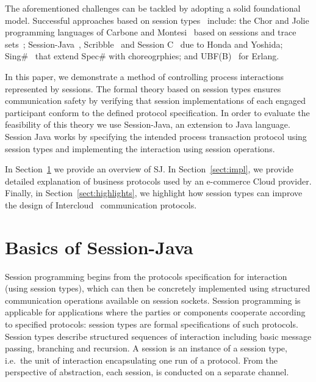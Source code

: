 \documentclass{llncs}
\begin{document}
The aforementioned challenges can be tackled by adopting a solid foundational model. Successful approaches based on session types~\cite{session-types-sessions,carbone2007structured} include: the Chor and Jolie programming languages of Carbone and Montesi~\cite{chor-lang,carbone2013deadlock} based on sessions and trace sets~\cite{chor-essence}; Session-Java~\cite{sj-lang}, Scribble~\cite{honda2011scribbling} and Session C~\cite{ng2012multiparty} due to Honda and Yoshida; Sing\#~\cite{basu2012deciding} that extend Spec\# with choreogrphies; and UBF(B)~\cite{armstrong2002getting} for Erlang.

In this paper, we demonstrate a method of controlling process interactions represented by sessions. The formal theory based on session types ensures communication safety by verifying that session implementations of each engaged participant conform to the defined protocol specification. In order to evaluate the feasibility of this theory we use Session-Java, an extension to Java language. Session Java works by specifying the intended process transaction protocol using session types and implementing the interaction using session operations.



In Section~\ref{sect:basics} we provide an overview of SJ.
In Section~\ref{sect:impl}, we provide detailed explanation of business protocols used by an e-commerce Cloud provider.
Finally, in Section~\ref{sect:highlights}, we highlight how session types can improve the design of Intercloud~\cite{intercloud} communication protocols.


\section{Basics of Session-Java}
\label{sect:basics}

Session programming begins from the protocols specification for interaction (using session types), which can then be concretely implemented using structured communication operations available on session sockets. Session programming is applicable for applications where the parties or components cooperate according to specified protocols: session types are formal specifications of such protocols. Session types describe structured sequences of interaction including basic message passing, branching and recursion. A session is an instance of a session type, i.e.\ the unit of interaction encapsulating one run of a protocol. From the perspective of abstraction, each session, is conducted on a separate channel. 
\end{document}
